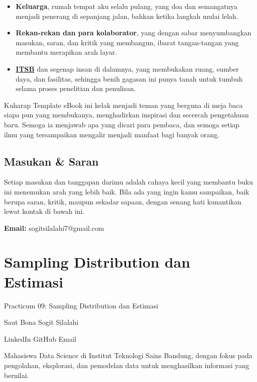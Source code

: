 \documentclass[
  indonesian,
  letterpaper,
]{book}
\providecommand{\tightlist}{%
  \setlength{\itemsep}{0pt}\setlength{\parskip}{0pt}}
\begin{document}
\begin{itemize}
\tightlist
\item
  \textbf{Keluarga}, rumah tempat aku selalu pulang, yang doa dan
  semangatnya menjadi penerang di sepanjang jalan, bahkan ketika langkah
  mulai lelah.
\item
  \textbf{Rekan-rekan dan para kolaborator}, yang dengan sabar
  menyumbangkan masukan, saran, dan kritik yang membangun, ibarat
  tangan-tangan yang membantu merapikan arah layar.
\item
  \textbf{\href{https://itsb.ac.id/}{ITSB}} dan segenap insan di
  dalamnya, yang membukakan ruang, sumber daya, dan fasilitas, sehingga
  benih gagasan ini punya tanah untuk tumbuh selama proses penelitian
  dan penulisan.
\end{itemize}

Kuharap Template eBook ini kelak menjadi teman yang berguna di meja baca
siapa pun yang membukanya, menghadirkan inspirasi dan secercah
pengetahuan baru. Semoga ia menjawab apa yang dicari para pembaca, dan
semoga setiap ilmu yang tersampaikan mengalir menjadi manfaat bagi
banyak orang.

\section*{Masukan \& Saran}\label{masukan-saran}


Setiap masukan dan tanggapan darimu adalah cahaya kecil yang membantu
buku ini menemukan arah yang lebih baik. Bila ada yang ingin kamu
sampaikan, baik berupa saran, kritik, maupun sekadar sapaan, dengan
senang hati kunantikan lewat kontak di bawah ini.

\textbf{Email:} sogitsilalahi7@gmail.com


\chapter{Sampling Distribution dan
Estimasi}\label{sampling-distribution-dan-estimasi}

Practicum 09: Sampling Distribution dan Estimasi

\hfill\break

Saut Bona Sogit Silalahi

LinkedIn {\textbar{}} GitHub {\textbar{}} Email

Mahasiswa Data Science di Institut Teknologi Sains Bandung, dengan fokus
pada pengolahan, eksplorasi, dan pemodelan data untuk menghasilkan
informasi yang bernilai.
\end{document}
